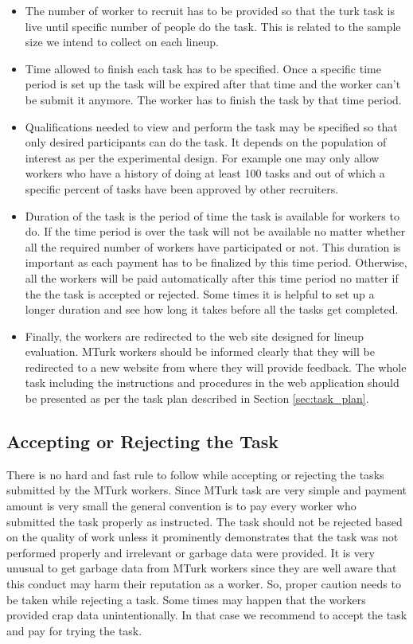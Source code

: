 \documentclass[11pt]{article}
\begin{document}
\begin{itemize}

\item The number of worker to recruit has to be provided so that the turk task is live until specific number of people do the task. This is related to the sample size we intend to collect on each lineup. 

\item Time allowed to finish each task has to be specified. Once a specific time period is set up the task will be expired after that time and the worker can't be submit it anymore. The worker has to finish the task by that time period. 

\item Qualifications needed to view and perform the task may be specified so that only desired participants can do the task. It depends on the population of interest as per the experimental design. For example one may only allow workers who have a history of doing at least 100 tasks and out of which a specific percent of tasks have been approved by other recruiters. 

\item Duration of the task is the period of time the task is available for workers to do. If the time period is over the task will not be available no matter whether all the required number of workers have participated or not. This duration is important as each payment has to be finalized by this time period. Otherwise, all the workers will be paid automatically after this time period no matter if the the task is accepted or rejected. Some times it is helpful to set up a longer duration and see how long it takes before all the tasks get completed.

\item Finally, the workers are redirected to the web site designed for lineup evaluation. MTurk workers should be informed clearly that they will be redirected to a new website from where they will provide feedback. The whole task including the instructions and procedures in the web application should be presented as per the task plan described in Section \ref{sec:task_plan}.

\end{itemize}

\subsection{Accepting or Rejecting the Task} There is no hard and fast rule to follow while accepting or rejecting the tasks submitted by the MTurk workers. Since MTurk task are very simple and payment amount is very small the general convention is to pay every worker who submitted the task properly as instructed. The task should not be rejected based on the quality of work unless it prominently demonstrates that the task was not performed properly and irrelevant or garbage data were provided. It is very unusual to get garbage data from MTurk workers since they are well aware that this conduct may harm their reputation as a worker. So, proper caution needs to be taken while rejecting a task. Some times may happen that the workers provided crap data unintentionally. In that case we recommend to accept the task and pay for trying the task.
\end{document}
